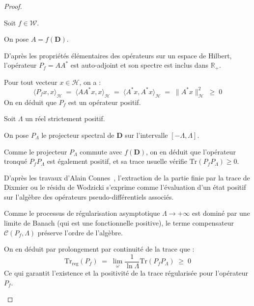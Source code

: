 \documentclass[Riemann_Hypothesis.tex]{subfiles}
\begin{document}
\begin{proof}
    \begin{part_proof}
        Soit $f \in \mathcal{W}$. \par
        On pose $A = f(\mathbf{D})$. \par
        D'après les propriétés élémentaires des opérateurs sur un espace de Hilbert, l'opérateur $P_f = A A^*$ est auto-adjoint et son spectre est inclus dans $\mathbb{R}_+$. \par
        Pour tout vecteur $x \in \mathcal{H}$, on a :
        \begin{equation*}
            \langle P_f x, x \rangle_{\mathcal{H}} \;=\; \langle A A^* x, x \rangle_{\mathcal{H}} \;=\; \langle A^* x, A^* x \rangle_{\mathcal{H}} \;=\; \|A^* x\|_{\mathcal{H}}^2 \;\geq\; 0
        \end{equation*}
        On en déduit que $P_f$ est un opérateur positif. \par
        Soit $\Lambda$ un réel strictement positif. \par
        On pose $P_\Lambda$ le projecteur spectral de $\mathbf{D}$ sur l'intervalle $[-\Lambda, \Lambda]$. \par
        Comme le projecteur $P_\Lambda$ commute avec $f(\mathbf{D})$, on en déduit que l'opérateur tronqué $P_f P_\Lambda$ est également positif, et sa trace usuelle vérifie $\mathrm{Tr}(P_f P_\Lambda) \geq 0$. \par
        D'après les travaux d'Alain Connes~\cite{connes1994_noncommutative}, l'extraction de la partie finie par la trace de Dixmier ou le résidu de Wodzicki s'exprime comme l'évaluation d'un état positif sur l'algèbre des opérateurs pseudo-différentiels associés. \par
        Comme le processus de régularisation asymptotique $\Lambda \to +\infty$ est dominé par une limite de Banach (qui est une fonctionnelle positive), le terme compensateur $\mathcal{C}(P_f, \Lambda)$ préserve l'ordre de l'algèbre. \par
        On en déduit par prolongement par continuité de la trace que :
        \begin{equation*}
            \mathrm{Tr}_{\mathrm{reg}}(P_f) \;=\; \lim_{\omega} \frac{1}{\ln \Lambda} \mathrm{Tr}(P_f P_\Lambda) \;\geq\; 0
        \end{equation*}
        Ce qui garantit l'existence et la positivité de la trace régularisée pour l'opérateur $P_f$.
    \end{part_proof}
\end{proof}
\end{document}
